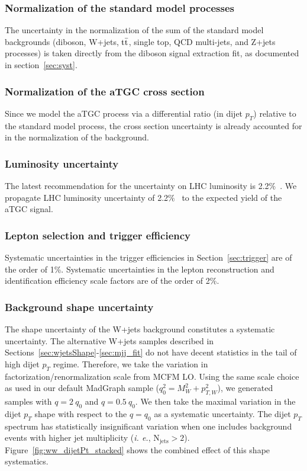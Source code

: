 \subsubsection{Normalization of the standard model processes}
The uncertainty in the normalization of the sum of the standard model backgrounds 
(diboson, W+jets, $\mathrm{t}\bar{\mathrm{t}}$,  single top, QCD multi-jets, and Z+jets processes) 
is taken directly from the diboson signal extraction fit, as 
documented in section~\ref{sec:syst}.
\subsubsection{Normalization of the aTGC cross section}
Since we model the aTGC process via a differential ratio 
(in dijet $p_T$) relative to the standard model process, 
the cross section uncertainty is already accounted for in 
the normalization of the background. 
\subsubsection{Luminosity uncertainty}
The latest recommendation for the uncertainty on LHC luminosity is 2.2$\%$~\cite{lumiPAS}.
We propagate LHC luminosity uncertainty of 2.2$\%$~\cite{lumiPAS} 
to the expected yield of the aTGC signal.
\subsubsection{Lepton selection and trigger efficiency}
Systematic uncertainties in the trigger efficiencies in
Section~\ref{sec:trigger} are of the order of 1\%. Systematic
uncertainties in the lepton reconstruction and identification
efficiency scale factors are of the order of 2\%. 
\subsubsection{Background shape uncertainty}
 The shape uncertainty of the W+jets background 
constitutes a systematic uncertainty. The alternative 
W+jets samples described in Sections~\ref{sec:wjetsShape}-\ref{sec:mjj_fit} 
do not have decent statistics in the tail of high dijet $p_T$ regime. 
Therefore, we take the variation in factorization/renormalization scale 
from MCFM LO. 
Using the same scale choice as used in our default MadGraph sample 
($q_0^2 = M_W^2 + p_{T, W}^2$), we generated samples with 
$q= 2~q_0$ and $q= 0.5~q_0$. 
We then take the maximal variation in the dijet $p_T$ shape with respect 
to the $q= q_0$ as a systematic uncertainty. 
The dijet $p_T$ spectrum has statistically insignificant variation 
when one includes background events with higher jet multiplicity 
(\textit{i. e.}, $\text{N}_{\text{jets}} >2$). 
Figure~\ref{fig:ww_dijetPt_stacked} shows the combined effect of this 
shape systematics.
